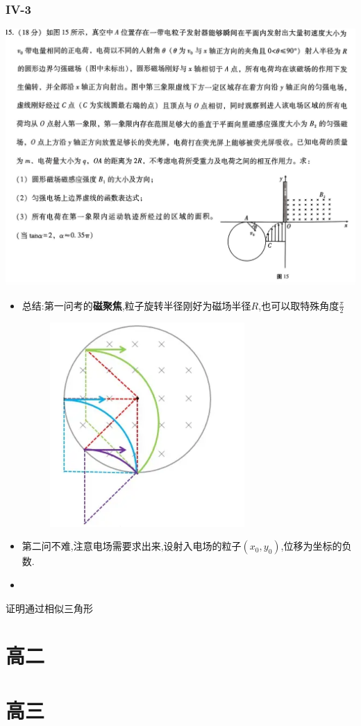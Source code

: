 \documentclass{article}
\begin{document}
        \subsubsection{IV-3}
        \includegraphics[width=50em,keepaspectratio]{./pictures/1.3-6.png}

        \begin{itemize}
            \item 总结:第一问考的\textbf{磁聚焦},粒子旋转半径刚好为磁场半径$R$,也可以取特殊角度$\frac{\pi}{2}$
            \begin{figure}[h]
                \centering
                \includegraphics[width=20em,keepaspectratio]{./pictures/1.3-7.png}
            \end{figure}
            \item 第二问不难,注意电场需要求出来,设射入电场的粒子$(x_{0},y_{0})$,位移为坐标的负数.
            \item 
        \end{itemize}
        
        证明通过相似三角形

        
    


    \section{高二}





    \section{高三}
\end{document}
